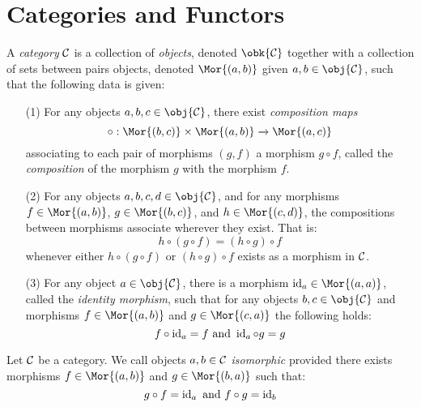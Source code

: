 \section{Categories and Functors}\label{section_1.1}

\begin{definition}
  A \textit{category} $\mathcal{C}$ is a collection of \textit{objects},
  denoted $\obk{\Cc}$ together with a collection of sets
  between pairs objects, denoted $\Mor{(a,b)}$ given $a,b \in
  \obj{\Cc}$, such that the following data is given:
  \begin{enumerate}
    \item[(1)] For any objects $a,b,c \in \obj{\Cc}$, there exist
      \textit{composition maps}
      \begin{equation*}
        \circ:\Mor{(b,c)} \times \Mor{(a,b)} \xrightarrow{} \Mor{(a,c)}
      \end{equation*}
      associating to each pair of
      morphisms $(g,f)$ a morphism $g \circ f$, called the
      \textit{composition} of the morphism $g$ with the morphism $f$.

    \item[(2)] For any objects $a,b,c,d \in \obj{\Cc}$, and for any
      morphisms $f \in \Mor{(a,b)}$, $g \in \Mor{(b,c)}$, and $h \in
      \Mor{(c,d)}$, the compositions between morphisms associate
      wherever they exist. That is:
      \begin{equation*}
        h \circ (g \circ f)=(h \circ g) \circ f
      \end{equation*}
      whenever either $h \circ (g \circ f)$ or $(h \circ g) \circ f$
      exists as a morphism in $\mathcal{C}$.

    \item[(3)] For any object $a \in \obj{\Cc}$, there is a morphism
      $\id_a \in \Mor{(a,a)}$, called the \textit{identity morphism},
      such that for any objects $b,c \in \obj{\Cc}$ and morphisms $f
      \in \Mor{(a,b)}$ and $g \in \Mor{(c,a)}$ the following holds:
      \begin{equation*}
        f \circ \operatorname{id}_a=f \text{ and } \operatorname{id}_a \circ g=g
      \end{equation*}
  \end{enumerate}
\end{definition}

\begin{definition}
  Let $\mathcal{C}$ be a category. We call objects $a,b \in \mathcal{C}$
  \textit{isomorphic} provided there exists morphisms $f \in
  \Mor{(a,b)}$ and $g \in \Mor{(b,a)}$ such that:
  \begin{equation*}
    g \circ f=\operatorname{id}_a \text{ and } f \circ g=\operatorname{id}_b
  \end{equation*}
\end{definition}
